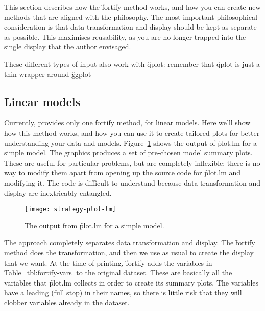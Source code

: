 {This section describes how the \f{fortify} method works, and how you can create new methods that are aligned with the \ggplot philosophy.  The most important philosophical consideration is that data transformation and display should be kept as separate as possible.  This maximises reusability, as you are no longer trapped into the single display that the author envisaged.  

These different types of input also work with \f{qplot}: remember that \f{qplot} is just a thin wrapper around \f{ggplot}

\subsection{Linear models}

Currently, \ggplot provides only one fortify method, for linear models. Here we'll show how this method works, and how you can use it to create tailored plots for better understanding your data and models. Figure~\ref{fig:plot-lm} shows the output of \f{plot.lm} for a simple model. The graphics produces a set of pre-chosen model summary plots. These are useful for particular problems, but are completely inflexible: there is no way to modify them apart from opening up the source code for \f{plot.lm} and modifying it. The code is difficult to understand because data transformation and display are inextricably entangled.


\begin{figure}[htbp]
  \centering
  \texttt{[image: strategy-plot-lm]}
  \caption{The output from \f{plot.lm} for a simple model.  }
  \label{fig:plot-lm}
\end{figure}

The \ggplot approach completely separates data transformation and display.  The \f{fortify} method does the transformation, and then we use \ggplot as usual to create the display that we want.  At the time of printing, \f{fortify} adds the variables in Table~\ref{tbl:fortify-vars} to the original dataset.  These are basically all the variables that \f{plot.lm} collects in order to create its summary plots.  The variables have a leading  (full stop) in their names, so there is little risk that they will clobber variables already in the dataset.  

}
